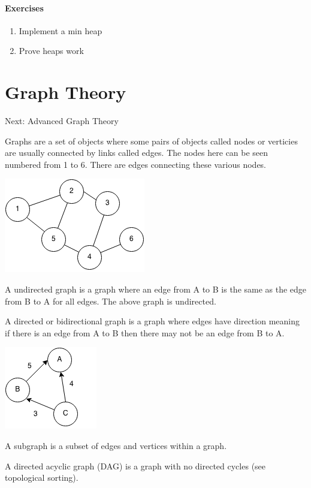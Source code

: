 \documentclass[11pt,oneside]{book}
\makeatletter
\def\maxwidth#1{\ifdim\Gin@nat@width>#1 #1\else\Gin@nat@width\fi}
\makeatother
\begin{document}
\subsection{Exercises}

\begin{enumerate}
\item Implement a min heap
\item Prove heaps work
\end{enumerate}

\part{ Graph Theory }
    

Next: Advanced Graph Theory

Graphs are a set of objects where some pairs of objects  called nodes or verticies are usually connected by links called edges. The nodes here can be seen numbered from 1 to 6. There are edges connecting these various nodes.

\includegraphics[width=\maxwidth{\textwidth}]{graph.png}

A undirected graph is a graph where an edge from A to B is the same as the edge from B to A for all edges. The above graph is undirected.

A directed or bidirectional graph is a graph where edges have direction meaning if there is an edge from A to B then there may not be an edge from B to A.

\includegraphics[width=\maxwidth{\textwidth}]{digraph.png}

A subgraph is a subset of edges and vertices within a graph.

A directed acyclic graph (DAG) is a graph with no directed cycles (see topological sorting).
\end{document}
